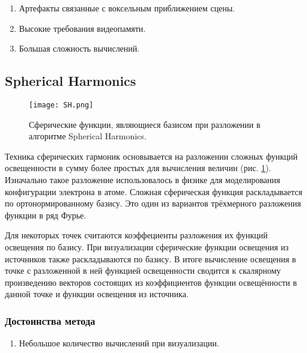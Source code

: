 \documentclass[12pt,fleqn]{article}
\begin{document}
\begin{enumerate}

\item Артефакты связанные с воксельным приближением сцены.

\item Высокие требования видеопамяти.

\item Большая сложность вычислений.

\end{enumerate}

\subsection{Spherical Harmonics}

\begin{figure}[htb]
    \centering
    \texttt{[image: SH.png]}
    \caption{Сферические функции, являющиеся базисом при разложении в алгоритме Spherical Harmonics.}
    \label{SH}
\end{figure}

Техника сферических гармоник \cite{SphericalHarmonics} основывается на разложении сложных функций освещенности в сумму более простых для вычисления величин (рис. \ref{SH}). Изначально такое разложение использовалось в физике для моделирования конфигурации электрона в атоме. Сложная сферическая функция раскладывается по ортонормированному базису. Это один из вариантов трёхмерного разложения функции в ряд Фурье.

Для некоторых точек считаются коэффециенты разложения их функций освещения по базису. При визуализации сферические функции освещения из источников также раскладываются по базису. В итоге вычисление освещения в точке с разложенной в ней функцией освещенности сводится к скалярному произведению векторов состоящих из коэффициентов функции освещённости в данной точке и функции освещения из источника.

\subsubsection{Достоинства метода}

\begin{enumerate}

\item Небольшое количество вычислений при визуализации.

\end{enumerate}
\end{document}
